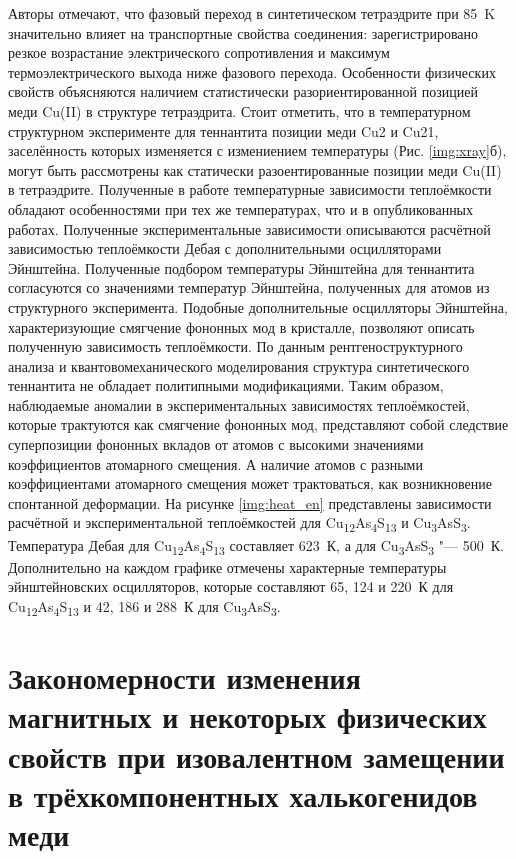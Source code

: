 Авторы \cite{Lara-Curzio2014} отмечают, что фазовый переход в синтетическом тетраэдрите при 85~K значительно  влияет на транспортные свойства соединения: зарегистрировано резкое возрастание электрического сопротивления и максимум термоэлектрического выхода ниже фазового перехода.
Особенности физических свойств объясняются наличием статистически разориентированной позицией меди Cu(II) в структуре тетраэдрита. Стоит отметить, что в температурном структурном эксперименте для теннантита позиции меди Cu2 и Cu21, заселённость которых изменяется с измениением температуры (Рис. \ref{img:xray}б), могут быть рассмотрены как статически разоентированные позиции меди Cu(II) в тетраэдрите.
Полученные в работе температурные  зависимости теплоёмкости обладают особенностями при тех же температурах, что и в опубликованных работах.
Полученные экспериментальные зависимости описываются расчётной зависимостью теплоёмкости Дебая с дополнительными осцилляторами Эйнштейна.
Полученные подбором температуры Эйнштейна для теннантита согласуются со значениями температур Эйнштейна, полученных для атомов из структурного эксперимента.
Подобные дополнительные осцилляторы Эйнштейна, характеризующие смягчение фононных мод в кристалле\cite{bab_81}, позволяют описать полученную зависимость теплоёмкости.
По данным рентгеноструктурного анализа и квантовомеханического моделирования структура синтетического теннантита не обладает политипными модификациями. Таким образом, наблюдаемые аномалии в экспериментальных зависимостях теплоёмкостей, которые трактуются как смягчение фононных мод, представляют собой следствие суперпозиции фононных вкладов от атомов с высокими значениями коэффициентов атомарного смещения.
А наличие атомов с разными коэффициентами атомарного смещения может трактоваться, как возникновение спонтанной деформации\cite{bab_1982,bab_81}.
На рисунке \ref{img:heat_en} представлены зависимости расчётной и экспериментальной теплоёмкостей для  Cu\textsubscript{12}As\textsubscript{4}S\textsubscript{13} и Cu\textsubscript{3}AsS\textsubscript{3}.
Температура Дебая для Cu\textsubscript{12}As\textsubscript{4}S\textsubscript{13} составляет 623~К, а для Cu\textsubscript{3}AsS\textsubscript{3} "--- 500~К.
Дополнительно на каждом графике отмечены характерные температуры эйнштейновских осцилляторов, которые составляют 65, 124 и 220~К для Cu\textsubscript{12}As\textsubscript{4}S\textsubscript{13} и 42, 186 и 288~К для Cu\textsubscript{3}AsS\textsubscript{3}.
\clearpage

\newpage

\section{Закономерности изменения магнитных и некоторых физических свойств при изовалентном замещении в трёхкомпонентных халькогенидов меди} \label{sect4_4}

